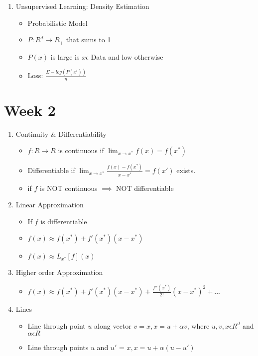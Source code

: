\documentclass[a4paper]{article}
\begin{document}
\begin{enumerate}
\begin{itemize}
		\end{itemize}
		\item Unsupervised Learning: Density Estimation
		\begin{itemize}
			\item Probabilistic Model
			\item $P:R^{d}\rightarrow R_{+}$ that sums to 1
			\item $P(x)$ is large is $x\epsilon$ Data and low otherwise
			\item Loss: $\frac{\Sigma -log(P(x^{i}))}{n}$
		\end{itemize}
	\end{enumerate}
\section{Week 2}
	\begin{enumerate}
		\item Continuity \& Differentiability
		\begin{itemize}
			\item $f:R\rightarrow R$ is continuous if $\lim_{x\to x^{*}}f(x) = f(x^{*})$
			\item Differentiable if $\lim_{x\to x^{*}}\frac{f(x) - f(x^{*})}{x - x^{*}} = f(x')$ exists.
			\item if $f$ is NOT continuous $\implies$ NOT differentiable
		\end{itemize}
		\item Linear Approximation
		\begin{itemize}
			\item If $f$ is differentiable
			\item $f(x)\approx f(x^{*}) + f'(x^{*})(x - x^{*})$
			\item $f(x)\approx L_{x^{*}}[f](x)$
		\end{itemize}
		\item Higher order Approximation
		\begin{itemize}
			\item $f(x)\approx f(x^{*}) + f'(x^{*})(x - x^{*}) + \frac{f''(x^{*})}{2!}(x - x^{*})^{2} + ...$
		\end{itemize}
		\item Lines
		\begin{itemize}
			\item Line through point $u$ along vector $v = {x, x = u + \alpha v}$, where $u,v,x\epsilon R^{d}$ and $\alpha \epsilon R$
			\item Line through points $u$ and $u'$ = ${x, x = u + \alpha (u - u')}$

\end{itemize}
\end{enumerate}
\end{document}
